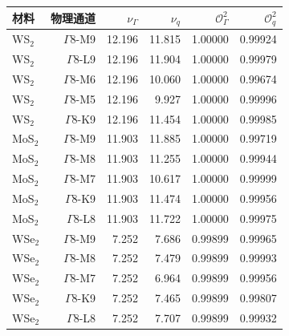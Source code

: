 \begin{tabular}{lrrrrr}
\toprule
材料 & 物理通道 & $\nu_\Gamma$ & $\nu_q$ & $\mathcal O_\Gamma^2$ & $\mathcal O_q^2$ \\
\midrule
WS$_2$ & $\Gamma$8-M9 & 12.196 & 11.815 & 1.00000 & 0.99924 \\
WS$_2$ & $\Gamma$8-L9 & 12.196 & 11.904 & 1.00000 & 0.99979 \\
WS$_2$ & $\Gamma$8-M6 & 12.196 & 10.060 & 1.00000 & 0.99674 \\
WS$_2$ & $\Gamma$8-M5 & 12.196 & 9.927 & 1.00000 & 0.99996 \\
WS$_2$ & $\Gamma$8-K9 & 12.196 & 11.454 & 1.00000 & 0.99985 \\
MoS$_2$ & $\Gamma$8-M9 & 11.903 & 11.885 & 1.00000 & 0.99719 \\
MoS$_2$ & $\Gamma$8-M8 & 11.903 & 11.255 & 1.00000 & 0.99944 \\
MoS$_2$ & $\Gamma$8-M7 & 11.903 & 10.617 & 1.00000 & 0.99999 \\
MoS$_2$ & $\Gamma$8-K9 & 11.903 & 11.474 & 1.00000 & 0.99956 \\
MoS$_2$ & $\Gamma$8-L8 & 11.903 & 11.722 & 1.00000 & 0.99975 \\
WSe$_2$ & $\Gamma$8-M9 & 7.252 & 7.686 & 0.99899 & 0.99965 \\
WSe$_2$ & $\Gamma$8-M8 & 7.252 & 7.479 & 0.99899 & 0.99993 \\
WSe$_2$ & $\Gamma$8-M7 & 7.252 & 6.964 & 0.99899 & 0.99956 \\
WSe$_2$ & $\Gamma$8-K9 & 7.252 & 7.465 & 0.99899 & 0.99807 \\
WSe$_2$ & $\Gamma$8-L8 & 7.252 & 7.707 & 0.99899 & 0.99932 \\
\bottomrule
\end{tabular}
